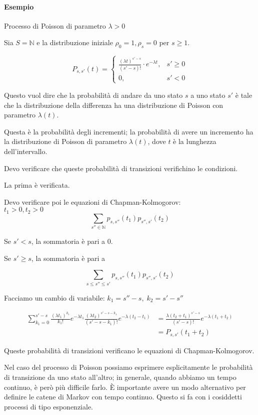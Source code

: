 \documentclass[a4paper,12pt]{book}
\begin{document}
\paragraph{Esempio} Processo di Poisson di parametro $\lambda > 0 $

Sia $ S = \mathbb{N} $ e la distribuzione iniziale $ \rho_0 = 1, \rho_s = 0 $ per $ s \ge 1 $.

$$ P_{s,s'}(t) = \begin{cases}
	\frac{(\lambda t)^{s'-s} }{(s'-s)!}\cdot e^{-\lambda t}, & s' \ge 0 \\
	0, & s' < 0
\end{cases} $$

Questo vuol dire che la probabilità di andare da uno stato $ s $ a uno stato $ s' $ è tale che la distribuzione della differenza ha una distribuzione di Poisson con parametro $\lambda(t)$.

Questa è la probabilità degli incrementi; la probabilità di avere un incremento ha la distribuzione di Poisson di parametro $\lambda(t)$, dove $ t $ è la lunghezza dell'intervallo.

Devo verificare che queste probabilità di transizioni verifichino le condizioni. 

La prima è verificata. 

Devo verificare poi le equazioni di Chapman-Kolmogorov:
\\
$ t_1 > 0, t_2 > 0 $
$$ \sum_{s'' \in \mathbb{N}} p_{s,s''} (t_1) p_{s'',s'} (t_2) $$

Se $ s' < s $, la sommatoria è pari a 0.

Se $ s' \ge s $, la sommatoria è pari a 

$$ \sum_{s \le s'' \le s'} p_{s,s''}(t_1) p_{s'',s'}(t_2) $$

Facciamo un cambio di variabile: $ k_1 = s'' - s, \; k_2 = s' - s'' $

\begin{align*}
\sum_{k_1 = 0}^{s'-s} \frac{(\lambda t_1)^{k_1}}{k_1 !} e^{-\lambda t_1} \frac{(\lambda t_2)^{s' - s - k_1}}{(s' - s - k_1) !} e^{-\lambda(t_2 - t_1)} & = \frac{\lambda(t_2 + t_1)^{s'-s}}{(s'-s)!} e^{-\lambda(t_1 + t_2)} \\
& = P_{s,s'}(t_1 + t_2)
\end{align*}

Queste probabilità di transizioni verificano le equazioni di Chapman-Kolmogorov. 

Nel caso del processo di Poisson possiamo esprimere esplicitamente le probabilità di transizione da uno stato all'altro; in generale, quando abbiamo un tempo continuo, è però più difficile farlo. È importante avere un modo alternativo per definire le catene di Markov con tempo continuo. Questo si fa con i cosiddetti processi di tipo esponenziale. 
\end{document}
